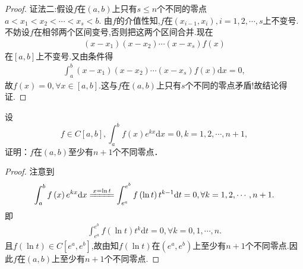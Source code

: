 \documentclass[../../main.tex]{subfiles}
\begin{document}
\begin{proof}
{\color{blue}证法二:}假设$f$在$\left( a,b \right)$上只有$s\leqslant n$个不同的零点
$a<x_1<x_2<\cdots <x_s<b.$
由$f$的介值性知,$f$在$\left( x_{i-1},x_i \right) ,i=1,2,\cdots ,s$上不变号.
不妨设$f$在相邻两个区间变号,否则把这两个区间合并.现在
\begin{align*}
\left( x-x_1 \right) \left( x-x_2 \right) \cdots \left( x-x_s \right) f\left( x \right)
\end{align*}
在$\left[ a,b \right]$上不变号.又由条件得
\begin{align*}
\int_a^b{\left( x-x_1 \right) \left( x-x_2 \right) \cdots \left( x-x_s \right) f\left( x \right) \mathrm{d}x}=0,
\end{align*}
故$f\left( x \right) =0,\forall x\in \left[ a,b \right]$.这与$f$在$\left( a,b \right)$上只有$s$个不同的零点矛盾!故结论得证.

\end{proof}

\begin{example}
设
\[
f \in C[a,b], \int_a^b f(x)e^{kx}\mathrm{d}x = 0, k = 1,2,\cdots,n + 1,
\]
证明：$f$在$(a,b)$至少有$n + 1$个不同零点．
\end{example}
\begin{proof}
注意到
\begin{align*}
\int_a^b{f\left( x \right) e^{kx}\mathrm{d}x}\xlongequal{x=\ln t}\int_{e^a}^{e^b}{f\left( \ln t \right) t^{k-1}\mathrm{d}t}=0,\forall k=1,2,\cdots ,n+1.
\end{align*}
即
\begin{align*}
\int_{e^a}^{e^b}{f\left( \ln t \right) t^k\mathrm{d}t}=0,\forall k=0,1,\cdots ,n.
\end{align*}
且$f\left( \ln t \right) \in C\left[ e^a,e^b \right]$,故由知$f\left( \ln t \right)$在$\left( e^a,e^b \right)$上至少有$n+1$个不同零点.因此$f$在$\left( a,b \right)$上至少有$n+1$个不同零点.

\end{proof}
\end{document}
